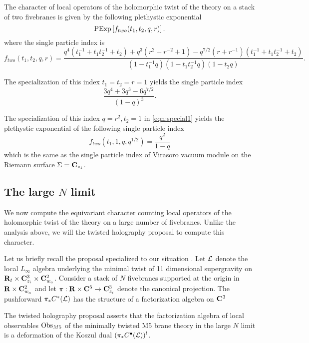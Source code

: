\documentclass[11pt]{amsart}
\begin{document}
\begin{conj}
The character of local operators of the holomorphic twist of the theory on a stack of two fivebranes is given by the following plethystic exponential
\[
{\rm PExp} \left[f_{two} (t_1,t_2,q,r) \right] .
\]
where the single particle index is
\[
f_{two} (t_1,t_2,q,r) = \frac{q^4(t_1^{-1} + t_1 t_2^{-1}  + t_2) + q^3 (r^2 + r^{-2} + 1) - q^{7/2} (r + r^{-1})(t_1^{-1} + t_1t_2^{-1} + t_2)}{(1-t_1^{-1}q) (1-t_1 t_2^{-1} q) (1-t_2 q)} .
\]
\end{conj}

\parsec[]

The specialization of this index $t_1=t_2=r=1$ yields the single particle index
\[
\frac{3q^4 + 3 q^3 - 6 q^{7/2}}{(1-q)^3}. 
\]

\parsec[]

The specialization of this index $q=r^2, t_2=1$ in \eqref{eqn:special1} yields the plethystic exponential of the following single particle index
\[
f_{two}(t_1, 1, q, q^{1/2}) = \frac{q^2}{1-q} 
\]
which is the same as the single particle index of Virasoro vacuum module on the Riemann surface $\Sigma = \mathbf{C}_{z_1}$. 

\subsection{The large $N$ limit}

We now compute the equivariant character counting local operators of the holomorphic twist of the theory on a large number of fivebranes. 
Unlike the analysis above, we will the twisted holography proposal to compute this character. 

Let us briefly recall the proposal specialized to our situation . Let $\mathcal L$ denote the local $L_{\infty}$ algebra underlying the minimal twist of 11 dimensional supergravity on $\mathbf{R}_{t}\times \mathbf{C}^{3}_{z_{i}}\times \mathbf{C}^{2}_{w_{a}}$. Consider a stack of $N$ fivebranes supported at the origin in $\mathbf{R}\times \mathbf{C}^{2}_{w_{a}}$ and let $\pi : \mathbf{R}\times \mathbf{C}^{5}\to \mathbf{C}^{3}_{z_{i}}$ denote the canonical projection. The pushforward $\pi_{*} C^{*}(\mathcal L)$ has the structure of a factorization algebra on $\mathbf{C}^{3}$

The twisted holography proposal asserts that the factorization algebra of local observables $\operatorname{Obs}_{M5}$ of the minimally twisted M5 brane theory in the large $N$ limit is a deformation of the Koszul dual $(\pi_{*} C^{\bullet}(\mathcal L))^{!}$.
\end{document}
